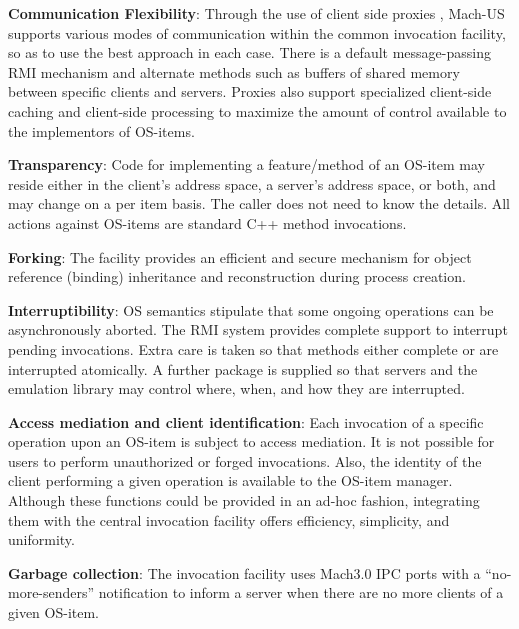 \begin{description}
\item{\bf Communication Flexibility}:
Through the use of client side proxies \cite{SHAPIRO86}, Mach-US supports
various modes of communication within
the common invocation facility, so as to use the best approach in each
case.  There is a default message-passing RMI mechanism
and alternate methods such as buffers of shared memory between
specific clients and servers.
Proxies also support specialized client-side caching and
client-side processing to maximize the amount of control available to
the implementors of OS-items.

\item{\bf Transparency}:
Code for implementing
a feature/method of an OS-item may reside either
in the client's address space, a server's address space,
or both, and may change
on a per item basis.
The caller does not need to know the details.  All actions against OS-items
are standard C++ method invocations.

\item{\bf Forking}:
The facility provides an efficient and secure mechanism for 
object reference (binding) inheritance and reconstruction
during process creation.

\item{\bf Interruptibility}:
OS semantics stipulate that some ongoing operations can be asynchronously
aborted.  The RMI system
provides complete support to interrupt pending invocations.
Extra care is taken so that methods either complete or are
interrupted atomically.
A further package is supplied so that servers and the emulation library
may control where, when, and how they are interrupted.

\item{\bf Access mediation and client identification}:
Each invocation of a specific operation upon an OS-item is
subject to access mediation.  It is not possible
for users to perform unauthorized or forged invocations.
Also, the identity of the client
performing a given operation is available to the OS-item
manager.  Although these functions could be provided in an ad-hoc fashion,
integrating them with the central invocation
facility offers efficiency, simplicity, and uniformity.

\item{\bf Garbage collection}:
The invocation facility uses Mach3.0 IPC ports \cite{MachIPC}
with a ``no-more-senders'' notification
to inform a server when there are no more clients of a given OS-item.
\end{description}

